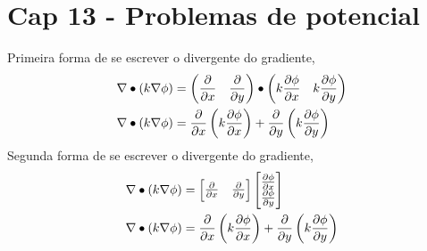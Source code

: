 \section{Cap 13 - Problemas de potencial}

Primeira forma de se escrever o divergente do gradiente,
%
\begin{equation}
	\begin{split}
	&\nabla \bullet \left(k \nabla \phi\right) = \left(\frac{\partial }{\partial x} \quad \frac{\partial }{\partial y}\right) \bullet \left(k \frac{\partial \phi}{\partial x} \quad k \frac{\partial \phi}{\partial y}\right)\\
	&\nabla \bullet \left(k \nabla \phi\right) = \frac{\partial }{\partial x} \left(k \frac{\partial \phi}{\partial x}\right) + \frac{\partial }{\partial y} \left(k \frac{\partial \phi}{\partial y}\right)
	\end{split}
\end{equation}
%
Segunda forma de se escrever o divergente do gradiente,
%
\begin{equation}
	\begin{split}
		&\nabla \bullet \left(k \nabla \phi\right)
		=
		\begin{bmatrix}
			\frac{\partial }{\partial x} & \frac{\partial }{\partial y}
		\end{bmatrix}
		\begin{bmatrix}
		\frac{\partial \phi}{\partial x}\\
		\frac{\partial \phi}{\partial y}
		\end{bmatrix}\\
		&\nabla \bullet \left(k \nabla \phi\right) = \frac{\partial }{\partial x} \left(k \frac{\partial \phi}{\partial x}\right) + \frac{\partial }{\partial y} \left(k \frac{\partial \phi}{\partial y}\right)
	\end{split}
\end{equation}